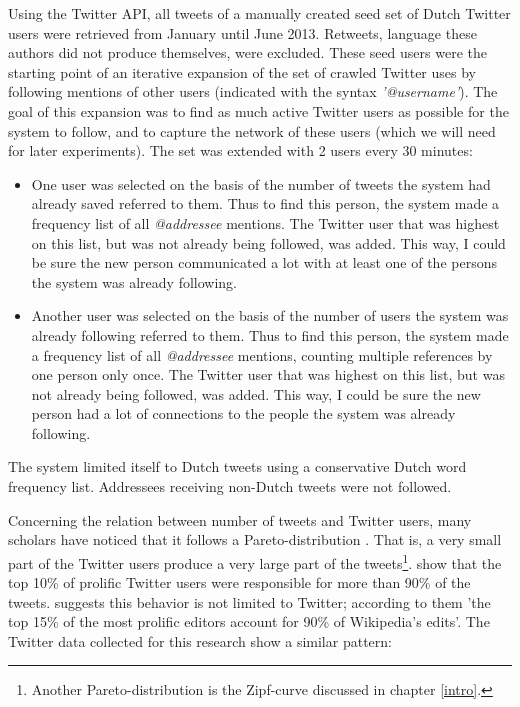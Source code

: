 \documentclass[12pt]{article}
\begin{document}
Using the Twitter API, all tweets of a manually created seed set of Dutch Twitter users were retrieved from January until June 2013. Retweets, language these authors did not produce themselves, were excluded. These seed users were the starting point of an iterative expansion of the set of crawled Twitter uses by following mentions of other users (indicated with the syntax \emph{'@username'}). The goal of this expansion was to find as much active Twitter users as possible for the system to follow, and to capture the network of these users (which we will need for later experiments). The set was extended with 2 users every 30 minutes:

\begin{itemize}
\item One user was selected on the basis of the number of tweets the system had already saved referred to them. Thus to find this person, the system made a frequency list of all \emph{@addressee} mentions. The Twitter user that was highest on this list, but was not already being followed, was added. This way, I could be sure the new person communicated a lot with at least one of the persons the system was already following.
\item Another user was selected on the basis of the number of users the system was already following referred to them. Thus to find this person, the system made a frequency list of all \emph{@addressee} mentions, counting multiple references by one person only once. The Twitter user that was highest on this list, but was not already being followed, was added. This way, I could be sure the new person had a lot of connections to the people the system was already following.
\end{itemize}

The system limited itself to Dutch tweets using a conservative Dutch word frequency list. Addressees receiving non-Dutch tweets were not followed.

Concerning the relation between number of tweets and Twitter users, many scholars have noticed that it follows a Pareto-distribution . That is, a very small part of the Twitter users produce a very large part of the tweets\footnote{Another Pareto-distribution is the Zipf-curve discussed in chapter \ref{intro}.}.  show that the top 10\% of prolific Twitter users were responsible for more than 90\% of the tweets.  suggests this behavior is not limited to Twitter; according to them 'the top 15\% of the most prolific editors account for 90\% of Wikipedia’s edits'. The Twitter data collected for this research show a similar pattern:
\end{document}
